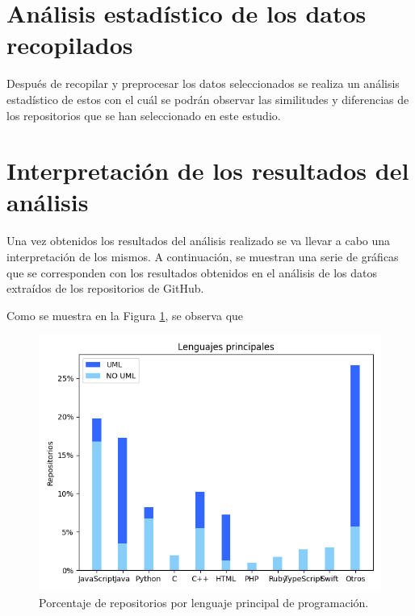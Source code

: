 \documentclass[a4paper, 12pt]{book}
\begin{document}
\section{Análisis estadístico de los datos recopilados}
\label{sec:análisis descriptivo de los datos recopilado}

Después de recopilar y preprocesar los datos seleccionados se realiza un análisis estadístico de estos con el cuál se podrán observar las similitudes y diferencias de los repositorios que se han seleccionado en este estudio.


\section{Interpretación de los resultados del análisis}
\label{sec:interpretación de los resultados del análisis}

Una vez obtenidos los resultados del análisis realizado se va llevar a cabo una interpretación de los mismos.
A continuación, se muestran una serie de gráficas que se corresponden con los resultados obtenidos en el análisis de los datos extraídos de los repositorios de GitHub.

Como se muestra en la Figura \ref{fig:Figure_language}, se observa que 

\begin{figure}
  \centering
  \includegraphics[width=12cm, keepaspectratio]{img/Figure_languages.png}
  \caption{Porcentaje de repositorios por lenguaje principal de programación.}\label{fig:Figure_language}
\end{figure}
\end{document}
